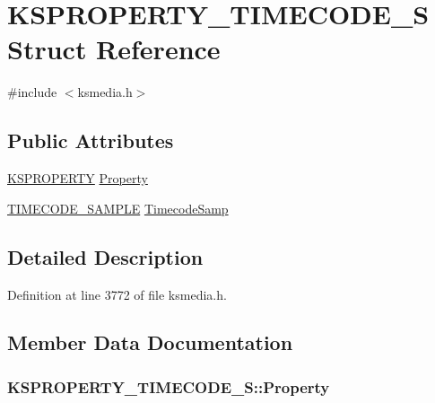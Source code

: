 \hypertarget{struct_k_s_p_r_o_p_e_r_t_y___t_i_m_e_c_o_d_e___s}{}\section{K\+S\+P\+R\+O\+P\+E\+R\+T\+Y\+\_\+\+T\+I\+M\+E\+C\+O\+D\+E\+\_\+S Struct Reference}
\label{struct_k_s_p_r_o_p_e_r_t_y___t_i_m_e_c_o_d_e___s}


{\ttfamily \#include $<$ksmedia.\+h$>$}

\subsection*{Public Attributes}
\begin{DoxyCompactItemize}
\item 
\hyperlink{ks_8h_a4392f77c74e868d813d46c39ada4d660}{K\+S\+P\+R\+O\+P\+E\+R\+TY} \hyperlink{struct_k_s_p_r_o_p_e_r_t_y___t_i_m_e_c_o_d_e___s_a119ec5450eb28e49eea36bef236ae7e6}{Property}
\item 
\hyperlink{ksmedia_8h_af08e714c66f0697a0eae3f8f9df70f19}{T\+I\+M\+E\+C\+O\+D\+E\+\_\+\+S\+A\+M\+P\+LE} \hyperlink{struct_k_s_p_r_o_p_e_r_t_y___t_i_m_e_c_o_d_e___s_a3ba1bf1fbdf129c6498115a6ebf45695}{Timecode\+Samp}
\end{DoxyCompactItemize}


\subsection{Detailed Description}


Definition at line 3772 of file ksmedia.\+h.



\subsection{Member Data Documentation}
\subsubsection[{\texorpdfstring{Property}{Property}}]{ K\+S\+P\+R\+O\+P\+E\+R\+T\+Y\+\_\+\+T\+I\+M\+E\+C\+O\+D\+E\+\_\+\+S\+::\+Property}\hypertarget{struct_k_s_p_r_o_p_e_r_t_y___t_i_m_e_c_o_d_e___s_a119ec5450eb28e49eea36bef236ae7e6}{}\label{struct_k_s_p_r_o_p_e_r_t_y___t_i_m_e_c_o_d_e___s_a119ec5450eb28e49eea36bef236ae7e6}


